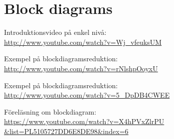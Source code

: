 \documentclass[a4paper]{article}
\begin{document}


\section{Block diagrams}
Introduktionsvideo på enkel nivå:\\
\href{http://www.youtube.com/watch?v=Wj_vfeuksUM}{http://www.youtube.com/watch?v=Wj\_vfeuksUM}

Exempel på blockdiagramsreduktion:\\
\href{http://www.youtube.com/watch?v=rNlshpOoyxU}{http://www.youtube.com/watch?v=rNlshpOoyxU}

Exempel på blockdiagramsreduktion:\\
\href{http://www.youtube.com/watch?v=5_DpDB4CWEE}{http://www.youtube.com/watch?v=5\_DpDB4CWEE}

Föreläsning om blockdiagram:\\
\href{https://www.youtube.com/watch?v=X4hPVxZlrPU&list=PL5105727DD6E8DE98&index=6}{https://www.youtube.com/watch?v=X4hPVxZlrPU\\\&list=PL5105727DD6E8DE98\&index=6}
\end{document}
